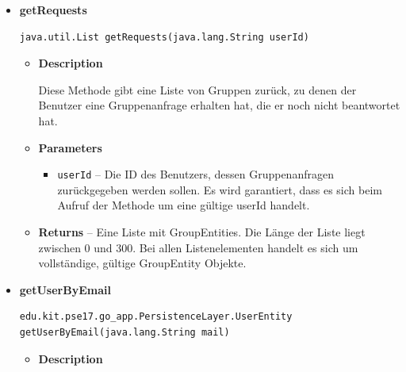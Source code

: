 \documentclass[11pt,a4paper]{article}
\begin{document}
{{{{{{{{{{{{\begin{itemize}
{\begin{itemize}
{Diese Methode gibt eine Liste mit allen Gruppen zurück, in denen der Benutzer Mitglied ist. Dies schließt Gruppen nicht mit ein, zu denen der Benutzer eingeladen wurde, er die Gruppenanfrage aber noch nicht beantwortet hat.
}
\item{
{\bf  Parameters}
  \begin{itemize}
   \item{
\texttt{userId} -- Die ID des Benutzers, dessen Gruppen zurückgegeben werden sollen. Es wird garantiert, dass es sich beim Aufruf der Methode um eine gültige userid handelt.}
  \end{itemize}
}%
\item{{\bf  Returns} -- 
Eine Liste mit GroupEntities. Die Länge der Liste liegt zwischen 0 und 300. Bei allen Listenelementen handelt es sich um vollständige, gültige GroupEntity Objekte. 
}%
\end{itemize}
}%
\item{ 
\hypertarget{edu.kit.pse17.go_app.PersistenceLayer.daos.UserDao.getRequests(java.lang.String)}{{\bf  getRequests}\\}
\begin{lstlisting}[frame=none]
java.util.List getRequests(java.lang.String userId)\end{lstlisting} %
\begin{itemize}
\item{
{\bf  Description}

Diese Methode gibt eine Liste von Gruppen zurück, zu denen der Benutzer eine Gruppenanfrage erhalten hat, die er noch nicht beantwortet hat.
}
\item{
{\bf  Parameters}
  \begin{itemize}
   \item{
\texttt{userId} -- Die ID des Benutzers, dessen Gruppenanfragen zurückgegeben werden sollen. Es wird garantiert, dass es sich beim Aufruf der Methode um eine gültige userId handelt.}
  \end{itemize}
}%
\item{{\bf  Returns} -- 
Eine Liste mit GroupEntities. Die Länge der Liste liegt zwischen 0 und 300. Bei allen Listenelementen handelt es sich um vollständige, gültige GroupEntity Objekte. 
}%
\end{itemize}
}%
\item{ 
\hypertarget{edu.kit.pse17.go_app.PersistenceLayer.daos.UserDao.getUserByEmail(java.lang.String)}{{\bf  getUserByEmail}\\}
\begin{lstlisting}[frame=none]
edu.kit.pse17.go_app.PersistenceLayer.UserEntity getUserByEmail(java.lang.String mail)\end{lstlisting} %
\begin{itemize}
\item{
{\bf  Description}

}
\end{itemize}}
\end{itemize}}}}}}}}}}}}}
\end{document}
